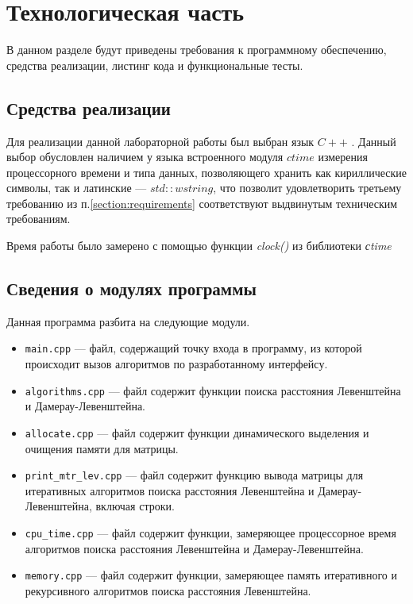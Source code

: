 \chapter{Технологическая часть}

В данном разделе будут приведены требования к программному обеспечению, средства реализации, листинг кода и функциональные тесты.

\section{Средства реализации}

Для реализации данной лабораторной работы был выбран язык $C++$ \cite{cpp-lang}. Данный выбор обусловлен наличием у языка встроенного модуля $ctime$ измерения процессорного времени и типа данных, позволяющего хранить как кириллические символы, так и латинские --- $std::wstring$, что позволит удовлетворить третьему требованию из п.\ref{section:requirements} соответствуют выдвинутым техническим требованиям.

Время работы было замерено с помощью функции \textit{clock()} из библиотеки \textit{сtime}~\cite{cpp-lang-time}
 
\clearpage
 
\section{Сведения о модулях программы}

Данная программа разбита на следующие модули.

\begin{itemize}
	\item \texttt{main.cpp} --- файл, содержащий точку входа в программу, из которой происходит вызов алгоритмов по разработанному интерфейсу.
	\item \texttt{algorithms.cpp} --- файл содержит функции поиска расстояния Левенштейна и Дамерау-Левенштейна.
	\item \texttt{allocate.cpp} --- файл содержит функции динамического выделения и очищения памяти для матрицы.
	\item \texttt{print\_mtr\_lev.cpp} --- файл содержит функцию вывода матрицы для итеративных алгоритмов поиска расстояния Левенштейна и Дамерау-Левенштейна, включая строки.
	\item \texttt{cpu\_time.cpp} --- файл содержит функции, замеряющее процессорное время алгоритмов поиска расстояния Левенштейна и \newline Дамерау-Левенштейна.
	\item \texttt{memory.cpp} --- файл содержит функции, замеряющее память итеративного и рекурсивного алгоритмов поиска расстояния Левенштейна.
\end{itemize}

